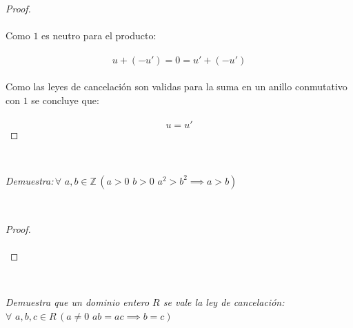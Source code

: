 \documentclass[11pt,letterpaper]{article}
\newcommand{\Z}{\mathbb{Z}}
\begin{document}
\begin{proof}
\begin{equation*}
    \end{equation*}\,\\
    Como $1$ es neutro para el producto:\,\\
    \,\\
    \begin{equation*}
        u+(-u')=0=u'+(-u')
    \end{equation*}\,\\
    Como las leyes de cancelaci\'on son validas para la suma en un anillo conmutativo con $1$ se concluye que:\,\\
    \,\\
    \begin{equation*}
        u=u'
    \end{equation*}
\end{proof}\,\\
\begin{tcolorbox}[
	title = \textcolor{black}{\textcolor{white}{Problema 4}},]
\textit{Demuestra:\,$\forall\,\,a,b\in \Z\,(a>0\,\,b>0\,\,a^2>b^2 \implies a>b)$
}
\end{tcolorbox}\,\\
\begin{proof}\,\\
    \,\\
\end{proof}\,\\
\begin{tcolorbox}[
	title = \textcolor{black}{\textcolor{white}{Problema 5}},]
\textit{Demuestra que un dominio entero $R$ se vale la ley de cancelaci\'on:\,\,$\forall\,\,a,b,c\in R\,(a\neq 0\,\,ab=ac \implies b=c)$
}
\end{tcolorbox}\,\\
\end{document}

